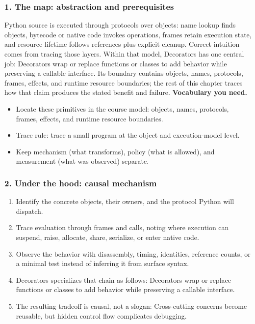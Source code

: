 \subsubsection*{1. The map: abstraction and prerequisites}
Python source is executed through protocols over objects: name lookup finds objects, bytecode or native code invokes operations, frames retain execution state, and resource lifetime follows references plus explicit cleanup. Correct intuition comes from tracing those layers.
Within that model, Decorators has one central job: Decorators wrap or replace functions or classes to add behavior while preserving a callable interface. Its boundary contains objects, names, protocols, frames, effects, and runtime resource boundaries; the rest of this chapter traces how that claim produces the stated benefit and failure.
\textbf{Vocabulary you need.}\begin{itemize}
\item Locate these primitives in the course model: objects, names, protocols, frames, effects, and runtime resource boundaries.
\item Trace rule: trace a small program at the object and execution-model level.
\item Keep mechanism (what transforms), policy (what is allowed), and measurement (what was observed) separate.
\end{itemize}
\subsubsection*{2. Under the hood: causal mechanism}\begin{enumerate}
\item Identify the concrete objects, their owners, and the protocol Python will dispatch.
\item Trace evaluation through frames and calls, noting where execution can suspend, raise, allocate, share, serialize, or enter native code.
\item Observe the behavior with disassembly, timing, identities, reference counts, or a minimal test instead of inferring it from surface syntax.
\item Decorators specializes that chain as follows: Decorators wrap or replace functions or classes to add behavior while preserving a callable interface.
\item The resulting tradeoff is causal, not a slogan: Cross-cutting concerns become reusable, but hidden control flow complicates debugging.
\end{enumerate}
